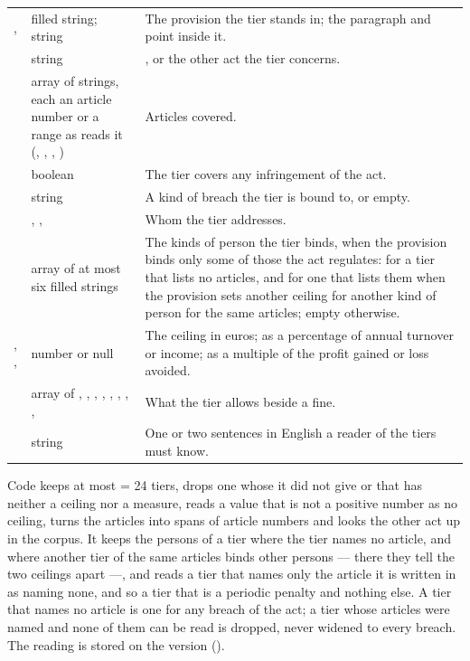 \par\nopagebreak
\begin{xltabular}{\textwidth}{@{}L{38mm}L{40mm}Y@{}}
\toprule
{} &  &  \\
\midrule
\endhead
\bottomrule
\endlastfoot
{},  & filled string; string & The provision the tier stands in; the paragraph and point inside it. \\
 & string & , or the other act the tier concerns. \\
 & array of strings, each an article number or a range as  reads it (, , , ) & Articles covered. \\
 & boolean & The tier covers any infringement of the act. \\
 & string & A kind of breach the tier is bound to, or empty. \\
 & , ,  & Whom the tier addresses. \\
 & array of at most six filled strings & The kinds of person the tier binds, when the provision binds only some of those the act regulates: for a tier that lists no articles, and for one that lists them when the provision sets another ceiling for another kind of person for the same articles; empty otherwise. \\
, ,  & number or null & The ceiling in euros; as a percentage of annual turnover or income; as a multiple of the profit gained or loss avoided. \\
 & array of , , , , , , , ,  & What the tier allows beside a fine. \\
 & string & One or two sentences in English a reader of the tiers must know. \\
\end{xltabular}

Code keeps at most  = 24 tiers, drops one whose  it did not
give or that has neither a ceiling nor a measure, reads a value that is not a positive number
as no ceiling, turns the articles into spans of article numbers and looks the other act up in the corpus.
It keeps the persons of a tier where the tier names no article, and where another tier of
the same articles binds other persons --- there they tell the two ceilings apart ---, and
reads a tier that names only the article it is written in as naming none, and so a tier
that is a periodic penalty and nothing else.
A tier that names no article is one for any breach of the act; a tier whose articles were
named and none of them can be read is dropped, never widened to every breach.
The reading is stored on the version ().

